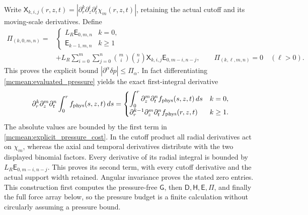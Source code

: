 Write \(\mathsf X_{k,i,j}(r,z,t)
=|\partial_r^k\partial_z^i\partial_t^j\chi_m(r,z,t)|\), retaining
the actual cutoff and its moving-scale derivatives. Define
\begin{equation}\label{mcmean:explicit_pressure_cost}
\begin{split}
 \mathsf\Pi_{(k,0,m,n)}={}&
 \begin{cases}L_R\mathsf E_{0,m,n}&k=0,\\
               \mathsf E_{k-1,m,n}&k\ge1
 \end{cases}\\
 &+L_R\sum_{i=0}^m\sum_{j=0}^n\binom mi\binom nj
           \mathsf X_{k,i,j}\mathsf E_{0,m-i,n-j},
 \qquad \mathsf\Pi_{(k,\ell,m,n)}=0\quad(\ell>0).
\end{split}
\end{equation}
This proves the explicit bound
\(|\partial^\alpha\delta p|\le\mathsf\Pi_\alpha\).
In fact differentiating \eqref{mcmean:evaluated_pressure} yields
the exact first-integral derivative
\[
 \partial_r^k\partial_z^m\partial_t^n
       \int_0^r f_{\rm phys}(s,z,t)\,ds
 =\begin{cases}
   \displaystyle\int_0^r\partial_z^m\partial_t^n
                         f_{\rm phys}(s,z,t)\,ds&k=0,\\
   \partial_r^{k-1}\partial_z^m\partial_t^n f_{\rm phys}(r,z,t)&k\ge1.
  \end{cases}
\]
The absolute values are bounded by the first term in
\eqref{mcmean:explicit_pressure_cost}. In the cutoff product all
radial derivatives act on \(\chi_m\), whereas the axial and temporal
derivatives distribute with the two displayed binomial factors.
Every derivative of its radial integral is bounded by
\(L_R\mathsf E_{0,m-i,n-j}\). This proves its second term, with
every cutoff derivative and the actual support width retained.
Angular invariance proves the stated zero entries. This construction
first computes the pressure-free \(\mathsf G\), then
\(\mathsf D,\mathsf H,\mathsf E,\mathsf\Pi\), and finally the
full force array below, so the pressure budget is a finite calculation
without circularly assuming a pressure bound.

